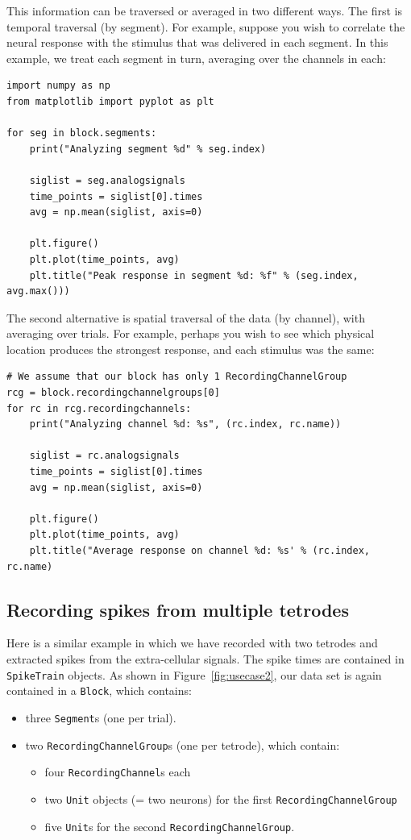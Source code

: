 \documentclass{frontiers}
\begin{document}
This information can be traversed or averaged in two different ways. The first is temporal traversal (by segment). For example, suppose you wish to correlate the neural response with the stimulus that was delivered in each segment. In this example, we treat each segment in turn, averaging over the channels in each:

\begin{lstlisting}[style=display]
import numpy as np
from matplotlib import pyplot as plt

for seg in block.segments:
    print("Analyzing segment %d" % seg.index)

    siglist = seg.analogsignals
    time_points = siglist[0].times
    avg = np.mean(siglist, axis=0)

    plt.figure()
    plt.plot(time_points, avg)
    plt.title("Peak response in segment %d: %f" % (seg.index, avg.max()))
\end{lstlisting}

The second alternative is spatial traversal of the data (by channel), with averaging over trials. For example, perhaps you wish to see which physical location produces the strongest response, and each stimulus was the same:

\begin{lstlisting}[style=display]
# We assume that our block has only 1 RecordingChannelGroup
rcg = block.recordingchannelgroups[0]
for rc in rcg.recordingchannels:
    print("Analyzing channel %d: %s", (rc.index, rc.name))

    siglist = rc.analogsignals
    time_points = siglist[0].times
    avg = np.mean(siglist, axis=0)

    plt.figure()
    plt.plot(time_points, avg)
    plt.title("Average response on channel %d: %s' % (rc.index, rc.name)
\end{lstlisting}


\subsection{Recording spikes from multiple tetrodes}

Here is a similar example in which we have recorded with two tetrodes and extracted spikes from the extra-cellular signals. The spike times are contained in \lstinline`SpikeTrain` objects. As shown in Figure~\ref{fig:usecase2}, our data set is again contained in a \lstinline`Block`, which contains:

\begin{itemize}
\item three \lstinline`Segment`s (one per trial).
\item two \lstinline`RecordingChannelGroup`s (one per tetrode), which contain:
  \begin{itemize}
  \item four \lstinline`RecordingChannel`s each
  \item two \lstinline`Unit` objects (= two neurons) for the first \lstinline`RecordingChannelGroup`
  \item five \lstinline`Unit`s for the second \lstinline`RecordingChannelGroup`.
  \end{itemize}
\end{itemize}
\end{document}

